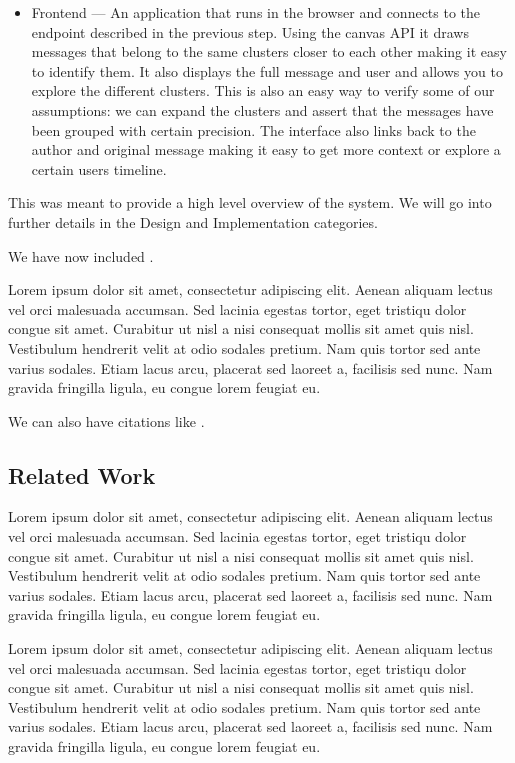 \begin{itemize}
	\item Frontend --- An application that runs in the browser and connects to the endpoint described in the previous step. Using the canvas API it draws messages that belong to the same clusters closer to each other making it easy to identify them. It also displays the full message and user and allows you to explore the different clusters. This is also an easy way to verify some of our assumptions: we can expand the clusters and assert that the messages have been grouped with certain precision. The interface also links back to the author and original message making it easy to get more context or explore a certain users timeline.
\end{itemize}
This was meant to provide a high level overview of the system. We will go into further details in the Design and Implementation categories.

We have now included .



Lorem ipsum dolor sit amet, consectetur adipiscing elit. Aenean aliquam lectus vel orci malesuada accumsan. Sed lacinia egestas tortor, eget tristiqu dolor congue sit amet. Curabitur ut nisl a nisi consequat mollis sit amet quis nisl. Vestibulum hendrerit velit at odio sodales pretium. Nam quis tortor sed ante varius sodales. Etiam lacus arcu, placerat sed laoreet a, facilisis sed nunc. Nam gravida fringilla ligula, eu congue lorem feugiat eu.

We can also have citations like \cite{iso-odf}.

\subsection{Related Work}

Lorem ipsum dolor sit amet, consectetur adipiscing elit. Aenean aliquam lectus vel orci malesuada accumsan. Sed lacinia egestas tortor, eget tristiqu dolor congue sit amet. Curabitur ut nisl a nisi consequat mollis sit amet quis nisl. Vestibulum hendrerit velit at odio sodales pretium. Nam quis tortor sed ante varius sodales. Etiam lacus arcu, placerat sed laoreet a, facilisis sed nunc. Nam gravida fringilla ligula, eu congue lorem feugiat eu.


Lorem ipsum dolor sit amet, consectetur adipiscing elit. Aenean aliquam lectus vel orci malesuada accumsan. Sed lacinia egestas tortor, eget tristiqu dolor congue sit amet. Curabitur ut nisl a nisi consequat mollis sit amet quis nisl. Vestibulum hendrerit velit at odio sodales pretium. Nam quis tortor sed ante varius sodales. Etiam lacus arcu, placerat sed laoreet a, facilisis sed nunc. Nam gravida fringilla ligula, eu congue lorem feugiat eu.


